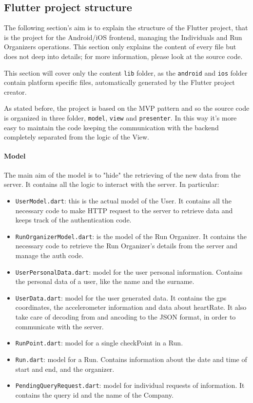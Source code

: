 \subsection{Flutter project structure}
The following section's aim is to explain the structure of the Flutter project, that is the project for the Android/iOS frontend, managing the Individuals and Run Organizers operations.
This section only explains the content of every file but does not deep into details; for more information, please look at the source code.

This section will cover only the content \texttt{lib} folder, as the \texttt{android} and \texttt{ios} folder contain platform specific files, automatically generated by the Flutter project creator.

As stated before, the project is based on the MVP pattern and so the source code is organized in three folder, \texttt{model}, \texttt{view} and \texttt{presenter}. In this way it's more easy to maintain the code keeping the communication with the backend completely separated from the logic of the View.

\paragraph{Model}
The main aim of the model is to "hide" the retrieving of the new data from the server. It contains all the logic to interact with the server. In particular:
\begin{itemize}
    \item \texttt{UserModel.dart}: this is the actual model of the User. It contains all the necessary code to make HTTP request to the server to retrieve data and keeps track of the authentication code.
    \item \texttt{RunOrganizerModel.dart}: is the model of the Run Organizer. It contains the necessary code to retrieve the Run Organizer's details from the server and manage the auth code.
    \item \texttt{UserPersonalData.dart}: model for the user personal information. Contains the personal data of a user, like the name and the surname.
    \item \texttt{UserData.dart}: model for the user generated data. It contains the gps coordinates, the accelerometer information and data about heartRate. It also take care of decoding from and ancoding to the JSON format, in order to communicate with the server.
    \item \texttt{RunPoint.dart}: model for a single checkPoint in a Run.
    \item \texttt{Run.dart}: model for a Run. Contains information about the date and time of start and end, and the organizer.
    \item \texttt{PendingQueryRequest.dart}: model for individual requests of information. It contains the query id and the name of the Company.
\end{itemize}

